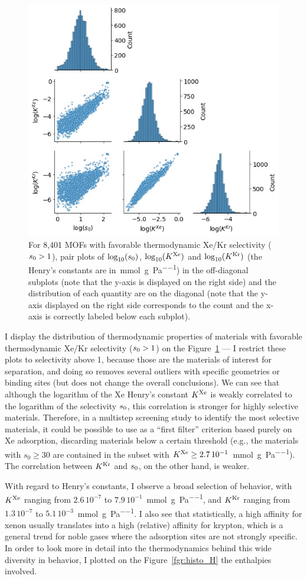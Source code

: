 \documentclass[main.tex]{subfiles}
\begin{document}
\begin{figure}[t]
\centering
  \includegraphics[width=0.6\linewidth]{figures/2-thermo/Henry_0.jpg}
  \caption{For 8,401 MOFs with favorable thermodynamic Xe/Kr selectivity ($s_{\text{0}} > 1$), pair plots of $\log_{\text{10}}(s_{\text{0}})$, $\log_{\text{10}}(K^{\text{Xe}})$ and $\log_{\text{10}}(K^{\text{Kr}})$ (the Henry's constants are in~\si{\milli\mol\per\gram\per\pascal}) in the off-diagonal subplots (note that the y-axis is displayed on the right side) and the distribution of each quantity are on the diagonal (note that the y-axis displayed on the right side corresponds to the count and the x-axis is correctly labeled below each subplot).}\label{fgr:histo_K}
\end{figure}


I display the distribution of thermodynamic properties of materials with favorable thermodynamic Xe/Kr selectivity ($s_{\text{0}} > 1$) on the Figure~\ref{fgr:histo_K} --- I restrict these plots to selectivity above 1, because those are the materials of interest for separation, and doing so removes several outliers with specific geometries or binding sites (but does not change the overall conclusions). We can see that although the logarithm of the Xe Henry's constant $K^{\text{Xe}}$ is weakly correlated to the logarithm of the selectivity $s_{\text{0}}$, this correlation is stronger for highly selective materials. Therefore, in a multistep screening study to identify the most selective materials, it could be possible to use as a ``first filter'' criterion based purely on Xe adsorption, discarding materials below a certain threshold (e.g., the materials with $s_0\ge30$ are contained in the subset with $K^{\text{Xe}}\ge2.7\,10^{-1}$~\si{\milli\mol\per\gram\per\pascal}). The correlation between $K^{\text{Kr}}$ and $s_{\text{0}}$, on the other hand, is weaker.

With regard to Henry's constants, I observe a broad selection of behavior, with $K^{\text{Xe}}$ ranging from $2.6\,10^{-7}$ to $7.9\,10^{-1}$~\si{\milli\mole\per\gram\per\pascal}, and $K^{\text{Kr}}$ ranging from $1.3\,10^{-7}$ to $5.1\,10^{-3}$~\si{\milli\mole\per\gram\per\pascal}. I also see that statistically, a high affinity for xenon usually translates into a high (relative) affinity for krypton, which is a general trend for noble gases where the adsorption sites are not strongly specific. In order to look more in detail into the thermodynamics behind this wide diversity in behavior, I plotted on the Figure~\ref{fgr:histo_H} the enthalpies involved.
\end{document}
